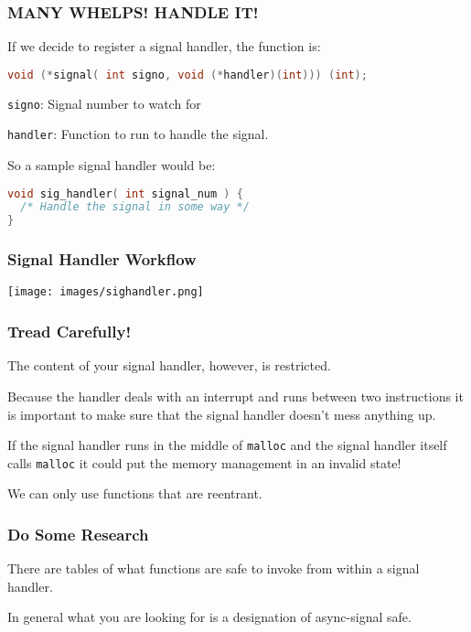 \begin{frame}[fragile]
	\frametitle{MANY WHELPS! HANDLE IT!}

	If we decide to register a signal handler, the function is:
	\begin{lstlisting}[language=C]
void (*signal( int signo, void (*handler)(int))) (int);
\end{lstlisting}

	\texttt{signo}: Signal number to watch for

	\texttt{handler}: Function to run to handle the signal.

	So a sample signal handler would be:
	\begin{lstlisting}[language=C]
void sig_handler( int signal_num ) {
  /* Handle the signal in some way */
}
\end{lstlisting}

\end{frame}


\begin{frame}
	\frametitle{Signal Handler Workflow}

	\begin{center}
		\texttt{[image: images/sighandler.png]}
	\end{center}


\end{frame}


\begin{frame}
	\frametitle{Tread Carefully!}

	The content of your signal handler, however, is restricted.

	Because the handler deals with an interrupt and runs between two instructions it is important to make sure that the signal handler doesn't mess anything up.

	If the signal handler runs in the middle of \texttt{malloc} and the signal handler itself calls \texttt{malloc} it could put the memory management in an invalid state!

	We can only use functions that are \alert{reentrant}.


\end{frame}


\begin{frame}
	\frametitle{Do Some Research}

	There are tables of what functions are safe to invoke from within a signal handler.

	In general what you are looking for is a designation of \alert{async-signal safe}.

\end{frame}


